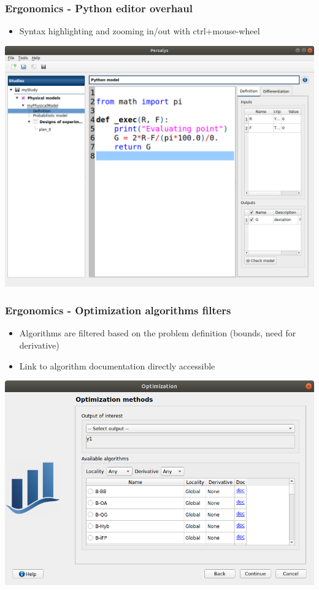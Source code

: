 \documentclass[aspectratio=169]{beamer}
\begin{document}

\begin{frame}
  \frametitle{Ergonomics - Python editor overhaul}
  \begin{itemize}
  \item Syntax highlighting and zooming in/out with ctrl+mouse-wheel
  \end{itemize}
  \begin{center}
    \includegraphics[height=0.65\textheight]{figures/python.png}
  \end{center}
\end{frame}


\begin{frame}
  \frametitle{Ergonomics - Optimization algorithms filters}
  \begin{itemize}
  \item Algorithms are filtered based on the problem definition (bounds, need for derivative)
  \item Link to algorithm documentation directly accessible
  \end{itemize}
  \begin{center}
    \includegraphics[height=0.65\textheight]{figures/optim.png}
 \end{center}
\end{frame}
\end{document}
